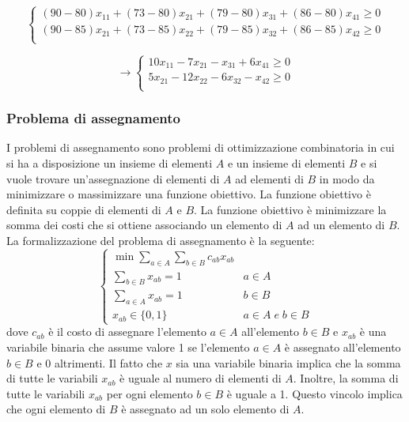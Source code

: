 \documentclass{article}
\begin{document}
\begin{equation*}
  \begin{cases}
    (90-80)x_{11} + (73-80)x_{21} + (79-80)x_{31} + (86-80)x_{41} \geq 0 \\
    (90-85)x_{21} + (73-85)x_{22} + (79-85)x_{32} + (86-85)x_{42} \geq 0 \\
  \end{cases}
\end{equation*}

\begin{equation*}
  \rightarrow
  \begin{cases}
    10x_{11}  -7x_{21}  -x_{31} + 6x_{41} \geq 0 \\
    5x_{21}  -12x_{22}  -6x_{32} -x_{42} \geq 0 \\
  \end{cases}
\end{equation*}

\subsubsection{Problema di assegnamento}
I problemi di assegnamento sono problemi di ottimizzazione combinatoria in cui 
si ha a disposizione un insieme di elementi $A$ e un insieme di 
elementi $B$ e si vuole trovare un'assegnazione di elementi di $A$ ad elementi 
di $B$ in modo da minimizzare o massimizzare una funzione obiettivo. La 
funzione obiettivo è definita su coppie di elementi di $A$ e $B$. La funzione 
obiettivo è minimizzare la somma dei costi che si ottiene associando un elemento 
di $A$ ad un elemento di $B$.
La formalizzazione del problema di assegnamento è la seguente:
\begin{equation*}
  \begin{cases}
    \min \sum_{a \in A} \sum_{b \in B} c_{ab}x_{ab} \\
    \sum_{b \in B} x_{ab} = 1 & a \in A \\
    \sum_{a \in A} x_{ab} = 1 & b \in B \\
    x_{ab} \in \{0,1\} & a \in A \; e \; b \in B
  \end{cases}
\end{equation*}
dove $c_{ab}$ è il costo di assegnare l'elemento $a \in A$ all'elemento $b \in 
B$ e $x_{ab}$ è una variabile binaria che assume valore 1 se l'elemento $a \in 
A$ è assegnato all'elemento $b \in B$ e 0 altrimenti. Il fatto che $x$ sia una 
variabile binaria implica che la somma di tutte le variabili $x_{ab}$ è 
uguale al numero di elementi di $A$. Inoltre, la somma di tutte le variabili 
$x_{ab}$ per ogni elemento $b \in B$ è uguale a 1. Questo vincolo implica che 
ogni elemento di $B$ è assegnato ad un solo elemento di $A$.
\end{document}
